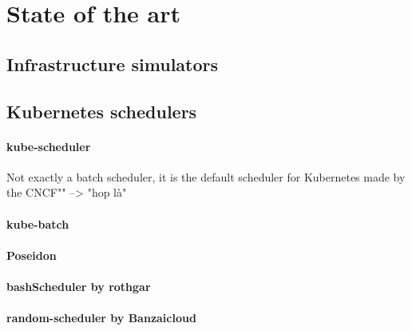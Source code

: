 \documentclass[12pt, a4paper]{memoir}
\begin{document}
\chapter{State of the art}
\section{Infrastructure simulators}

%

\section{Kubernetes schedulers}

\subsubsection*{kube-scheduler}
Not exactly a batch scheduler, it is the default scheduler for Kubernetes made
by the CNCF"" --> "hop là"
\subsubsection*{kube-batch}
\subsubsection*{Poseidon}
\subsubsection*{bashScheduler by rothgar}
\subsubsection*{random-scheduler by Banzaicloud}
\end{document}
